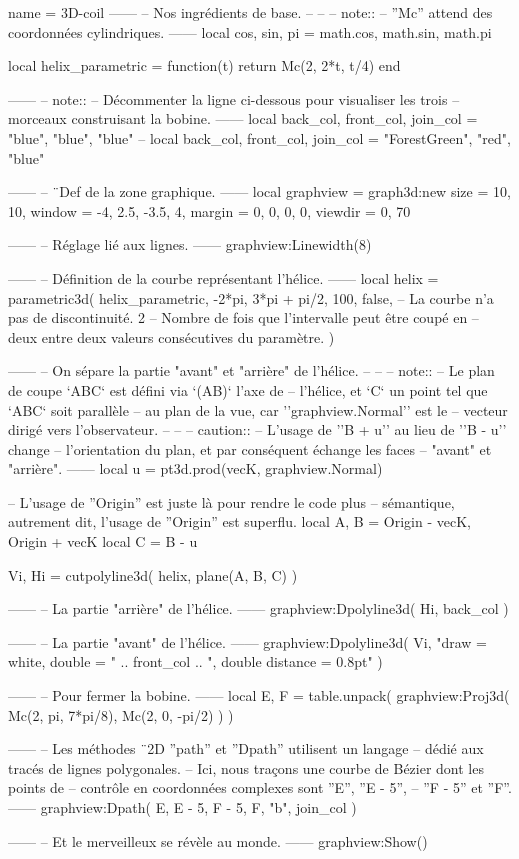 \documentclass[varwidth]{standalone}
\begin{document}
\begin{luadraw}{name = 3D-coil}
------
-- Nos ingrédients de base.
--
--
-- note::
--     ''Mc'' attend des coordonnées cylindriques.
------
local cos, sin, pi = math.cos, math.sin, math.pi

local helix_parametric = function(t)
  return Mc(2, 2*t, t/4)
end

------
-- note::
--     Décommenter la ligne ci-dessous pour visualiser les trois
--     morceaux construisant la bobine.
------
local back_col, front_col, join_col = "blue", "blue", "blue"
-- local back_col, front_col, join_col = "ForestGreen", "red", "blue"

------
-- ¨Def de la zone graphique.
------
local graphview = graph3d:new{
  size    = {10, 10},
  window  = {-4, 2.5, -3.5, 4},
  margin  = {0, 0, 0, 0},
  viewdir = {0, 70}
}

------
-- Réglage lié aux lignes.
------
graphview:Linewidth(8)

------
-- Définition de la courbe représentant l'hélice.
------
local helix = parametric3d(
  helix_parametric,
  -2*pi, 3*pi + pi/2,
  100,
  false,  -- La courbe n'a pas de discontinuité.
  2       -- Nombre de fois que l’intervalle peut être coupé en
          -- deux entre deux valeurs consécutives du paramètre.
)

------
-- On sépare la partie "avant" et "arrière" de l'hélice.
--
--
-- note::
--     Le plan de coupe `ABC` est défini via `(AB)` l'axe de
--     l'hélice, et `C` un point tel que `ABC` soit parallèle
--     au plan de la vue, car ''graphview.Normal'' est le
--     vecteur dirigé vers l'observateur.
--
--
-- caution::
--     L'usage de ''B + u'' au lieu de ''B - u'' change
--     l'orientation du plan, et par conséquent échange les faces
--     "avant" et "arrière".
------
local u = pt3d.prod(vecK, graphview.Normal)

-- L'usage de ''Origin'' est juste là pour rendre le code plus
-- sémantique, autrement dit, l'usage de ''Origin'' est superflu.
local A, B = Origin - vecK, Origin + vecK
local C    = B - u

Vi, Hi = cutpolyline3d(
  helix,
  plane(A, B, C)
)

------
-- La partie "arrière" de l'hélice.
------
graphview:Dpolyline3d(
  Hi,
  back_col
)

------
-- La partie "avant" de l'hélice.
------
graphview:Dpolyline3d(
  Vi,
     "draw = white, double = " .. front_col
  .. ", double distance = 0.8pt"
)

------
-- Pour fermer la bobine.
------
local E, F = table.unpack(
  graphview:Proj3d({
    Mc(2, pi, 7*pi/8),
    Mc(2, 0, -pi/2)
  })
)

------
-- Les méthodes ¨2D ''path'' et ''Dpath'' utilisent un langage
-- dédié aux tracés de lignes polygonales.
-- Ici, nous traçons une courbe de Bézier dont les points de
-- contrôle en coordonnées complexes sont ''E'', ''E - 5'',
-- ''F - 5'' et ''F''.
------
graphview:Dpath(
  {E, E - 5, F - 5, F, "b"},
  join_col
)

------
-- Et le merveilleux se révèle au monde.
------
graphview:Show()
\end{luadraw}
\end{document}
